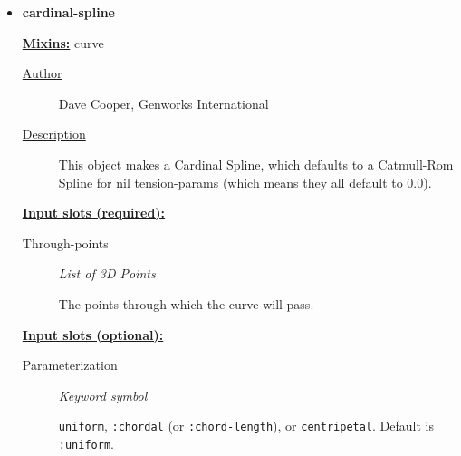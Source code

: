 \documentclass [11pt]{book}
\begin{document}
\begin{itemize}
\begin{description}
\end{description}







\item {}
\label{prim:cardinal-spline}
\textbf{cardinal-spline}


\textbf{
\underline{Mixins:}} curve





\begin{description}

\item [
\underline{Author}]


Dave Cooper, Genworks International



\item [
\underline{Description}]


This object makes a Cardinal Spline, which defaults
to a Catmull-Rom Spline for nil tension-params (which means they all
default to 0.0).



\end{description}








\textbf{
\underline{Input slots (required):}}

\begin{description}

\item [Through-points]
\emph{List of 3D Points}

 The points through which the curve will pass.




\end{description}






\textbf{
\underline{Input slots (optional):}}

\begin{description}

\item [Parameterization]
\emph{Keyword symbol}

\texttt{uniform}, \texttt{:chordal} (or \texttt{:chord-length}), or \texttt{centripetal}.
Default is \texttt{:uniform}.





\end{description}
\end{itemize}
\end{document}
